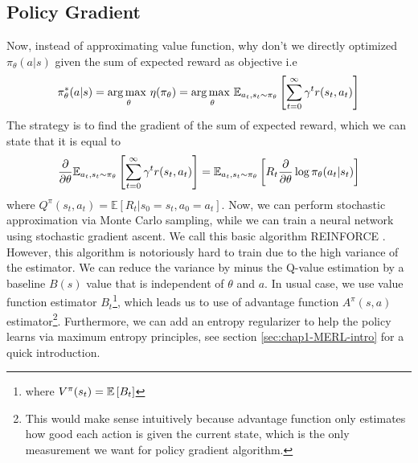 \subsection{Policy Gradient \cite{sutton2000policy}}
Now, instead of approximating value function, why don't we directly optimized $\pi_\theta(a | s)$ given the sum of expected reward as objective i.e 
\begin{equation}
    \pi_\theta^*(a | s) = \underset{\theta}{\arg\max \ } \eta(\pi_\theta) = \underset{\theta}{\arg\max \ }\mathbb{E}_{a_t, s_t \sim \pi_\theta}\left[ \sum^\infty_{t=0}\gamma^t r(s_t, a_t) \right]
\end{equation}
The strategy is to find the gradient of the sum of expected reward, which we can state that it is equal to
\begin{equation}
    \frac{\partial}{\partial \theta} \mathbb{E}_{a_t, s_t \sim \pi_\theta}\left[ \sum^\infty_{t=0}\gamma^t r(s_t, a_t) \right] = \mathbb{E}_{a_t, s_t \sim \pi_\theta}\left[ R_t\frac{\partial}{\partial \theta} \log \pi_\theta(a_t | s_t)  \right]
\end{equation}
where $Q^\pi(s_t, a_t) = \mathbb{E}\left[R_t | s_0 = s_t, a_0 = a_t\right]$. Now, we can perform stochastic approximation via Monte Carlo sampling, while we can train a neural network using stochastic gradient ascent. We call this basic algorithm REINFORCE \cite{sutton2000policy}. However, this algorithm is notoriously hard to train due to the high variance of the estimator. We can reduce the variance by minus the Q-value estimation by a baseline $B(s)$ value that is independent of $\theta$ and $a$. In usual case, we use value function estimator $B_t$\footnote{where $V^\pi(s_t) = \mathbb{E}\left[ B_t \right]$}, which leads us to use of advantage function $A^\pi(s, a)$ estimator\footnote{This would make sense intuitively because advantage function only estimates how good each action is given the current state, which is the only measurement we want for policy gradient algorithm.}. Furthermore, we can add an entropy regularizer to help the policy learns via maximum entropy principles, see section \ref{sec:chap1-MERL-intro} for a quick introduction.

